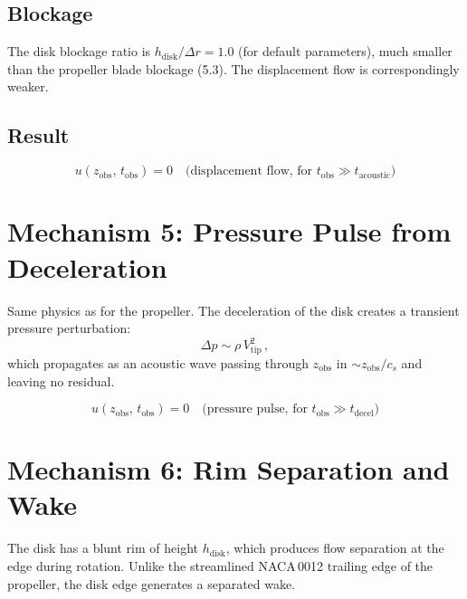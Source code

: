 \documentclass[11pt,a4paper]{article}
\begin{document}
\subsection{Blockage}

The disk blockage ratio is $h_\mathrm{disk}/\Delta r = 1.0$ (for
default parameters), much smaller than the propeller blade blockage
(5.3). The displacement flow is correspondingly weaker.

\subsection{Result}

\begin{equation}
  \boxed{u(z_\mathrm{obs},\, t_\mathrm{obs})
    = 0 \quad \text{(displacement flow, for }
    t_\mathrm{obs} \gg t_\mathrm{acoustic}\text{)}}
\end{equation}


\section{Mechanism 5: Pressure Pulse from Deceleration}
\label{sec:pressure}

Same physics as for the propeller. The deceleration of the disk
creates a transient pressure perturbation:
\begin{equation}
  \Delta p \sim \rho\,V_\mathrm{tip}^2\,,
\end{equation}
which propagates as an acoustic wave passing through $z_\mathrm{obs}$
in $\sim z_\mathrm{obs}/c_s$ and leaving no residual.

\begin{equation}
  \boxed{u(z_\mathrm{obs},\, t_\mathrm{obs})
    = 0 \quad \text{(pressure pulse, for }
    t_\mathrm{obs} \gg t_\mathrm{decel}\text{)}}
\end{equation}


\section{Mechanism 6: Rim Separation and Wake}
\label{sec:rim}

The disk has a blunt rim of height $h_\mathrm{disk}$, which produces
flow separation at the edge during rotation. Unlike the streamlined
NACA\,0012 trailing edge of the propeller, the disk edge generates a
separated wake.
\end{document}
